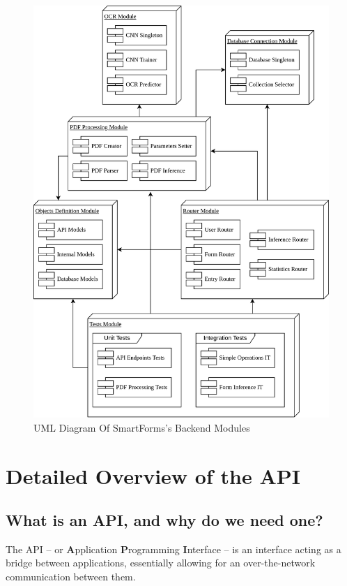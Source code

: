 \documentclass[11pt, a4paper]{report}
\begin{document}
\begin{figure}[!h]
	\centering
	\includegraphics[width=37em]{images/diagrams/ProjectModulesDiagram.png}
	\caption{UML Diagram Of SmartForms's Backend Modules}
	\label{smart-forms-modules}
\end{figure}


\chapter{Detailed Overview of the API}
\label{chapter-detailed-overview-of-the-api}

\section{What is an API, and why do we need one?}

The API -- or \textbf{A}pplication \textbf{P}rogramming \textbf{I}nterface -- is an interface acting as a bridge between applications, essentially allowing for an over-the-network communication between them.
\end{document}
